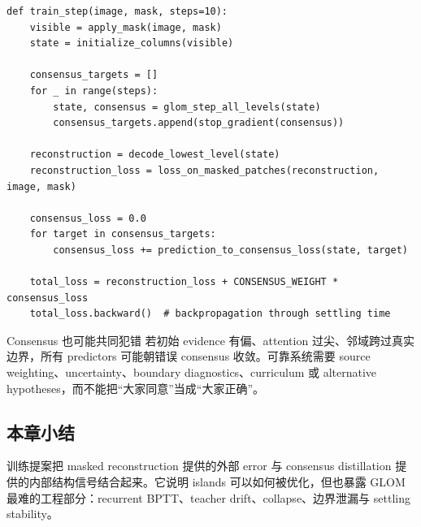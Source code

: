 \begin{lstlisting}[caption={Masked reconstruction 与 consensus training 的教学伪代码}]
def train_step(image, mask, steps=10):
    visible = apply_mask(image, mask)
    state = initialize_columns(visible)

    consensus_targets = []
    for _ in range(steps):
        state, consensus = glom_step_all_levels(state)
        consensus_targets.append(stop_gradient(consensus))

    reconstruction = decode_lowest_level(state)
    reconstruction_loss = loss_on_masked_patches(reconstruction, image, mask)

    consensus_loss = 0.0
    for target in consensus_targets:
        consensus_loss += prediction_to_consensus_loss(state, target)

    total_loss = reconstruction_loss + CONSENSUS_WEIGHT * consensus_loss
    total_loss.backward()  # backpropagation through settling time
\end{lstlisting}

\begin{warningbox}{Consensus 也可能共同犯错}
若初始 evidence 有偏、attention 过尖、邻域跨过真实边界，所有 predictors 可能朝错误 consensus 收敛。可靠系统需要 source weighting、uncertainty、boundary diagnostics、curriculum 或 alternative hypotheses，而不能把“大家同意”当成“大家正确”。
\end{warningbox}

\subsection{本章小结}

训练提案把 masked reconstruction 提供的外部 error 与 consensus distillation 提供的内部结构信号结合起来。它说明 islands 可以如何被优化，但也暴露 GLOM 最难的工程部分：recurrent BPTT、teacher drift、collapse、边界泄漏与 settling stability。

